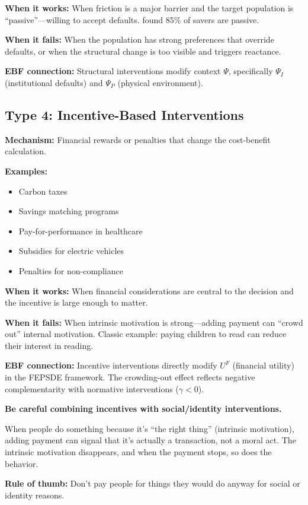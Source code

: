 \textbf{When it works:} When friction is a major barrier and the target population is ``passive''---willing to accept defaults. \citet{chetty2014} found 85\% of savers are passive.

\textbf{When it fails:} When the population has strong preferences that override defaults, or when the structural change is too visible and triggers reactance.

\textbf{EBF connection:} Structural interventions modify context $\Psi$, specifically $\Psi_I$ (institutional defaults) and $\Psi_P$ (physical environment).

\subsection{Type 4: Incentive-Based Interventions}

\textbf{Mechanism:} Financial rewards or penalties that change the cost-benefit calculation.

\textbf{Examples:}
\begin{itemize}[nosep]
\item Carbon taxes
\item Savings matching programs
\item Pay-for-performance in healthcare
\item Subsidies for electric vehicles
\item Penalties for non-compliance
\end{itemize}

\textbf{When it works:} When financial considerations are central to the decision and the incentive is large enough to matter.

\textbf{When it fails:} When intrinsic motivation is strong---adding payment can ``crowd out'' internal motivation. Classic example: paying children to read can reduce their interest in reading.

\textbf{EBF connection:} Incentive interventions directly modify $U^F$ (financial utility) in the FEPSDE framework. The crowding-out effect reflects negative complementarity with normative interventions ($\gamma < 0$).

\begin{tcolorbox}[colback=yellow!5!white, colframe=yellow!75!black,
    title=Warning: Crowding Out]
\textbf{Be careful combining incentives with social/identity interventions.}

When people do something because it's ``the right thing'' (intrinsic motivation), adding payment can signal that it's actually a transaction, not a moral act. The intrinsic motivation disappears, and when the payment stops, so does the behavior.

\textbf{Rule of thumb:} Don't pay people for things they would do anyway for social or identity reasons.
\end{tcolorbox}

